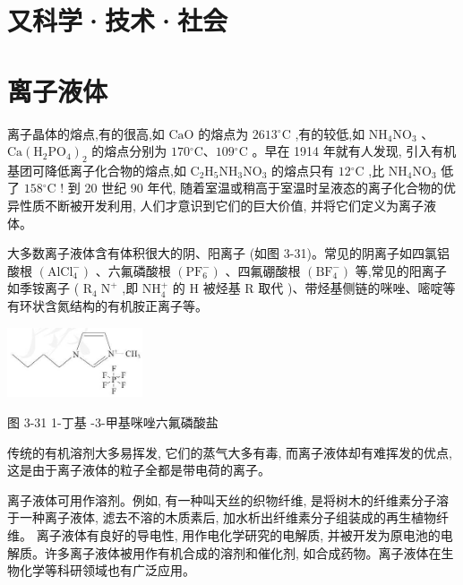 \documentclass[10pt]{article}
\begin{document}
\section*{又科学·技术·社会}

\section*{离子液体}

离子晶体的熔点,有的很高,如 \(\mathrm{{CaO}}\) 的熔点为 \({2613}{}^{ \circ }\mathrm{C}\) ,有的较低,如 \({\mathrm{{NH}}}_{4}{\mathrm{{NO}}}_{3}\) 、 \(\mathrm{{Ca}}{\left( {\mathrm{H}}_{2}{\mathrm{{PO}}}_{4}\right) }_{2}\) 的熔点分别为 \({170}{}^{ \circ }\mathrm{C}\text{、}{109}{}^{ \circ }\mathrm{C}\) 。早在 1914 年就有人发现, 引入有机基团可降低离子化合物的熔点,如 \({\mathrm{C}}_{2}{\mathrm{H}}_{5}{\mathrm{{NH}}}_{3}{\mathrm{{NO}}}_{3}\) 的熔点只有 \({12}{}^{ \circ }\mathrm{C}\) ,比 \({\mathrm{{NH}}}_{4}{\mathrm{{NO}}}_{3}\) 低了 \({158}{}^{ \circ }\mathrm{C}\) ! 到 20 世纪 90 年代, 随着室温或稍高于室温时呈液态的离子化合物的优异性质不断被开发利用, 人们才意识到它们的巨大价值, 并将它们定义为离子液体。

大多数离子液体含有体积很大的阴、阳离子 (如图 3-31)。常见的阴离子如四氯铝酸根 \(\left( {\mathrm{{AlCl}}}_{4}^{ - }\right)\) 、六氟磷酸根 \(\left( {\mathrm{{PF}}}_{6}^{ - }\right)\) 、四氟硼酸根 \(\left( {\mathrm{{BF}}}_{4}^{ - }\right)\) 等,常见的阳离子如季铵离子 ( \({\mathrm{R}}_{4}{\mathrm{\;N}}^{ + }\) ,即 \({\mathrm{{NH}}}_{4}^{ + }\) 的 \(\mathrm{H}\) 被烃基 \(\mathrm{R}\) 取代 )、带烃基侧链的咪唑、嘧啶等有环状含氮结构的有机胺正离子等。

\begin{center}
\includegraphics[max width=0.3\textwidth]{images/0190e026-5a11-7df7-bd27-54d09026ba7a_91_448409.jpg}
\end{center}

图 3-31 1-丁基 -3-甲基咪唑六氟磷酸盐

传统的有机溶剂大多易挥发, 它们的蒸气大多有毒, 而离子液体却有难挥发的优点, 这是由于离子液体的粒子全都是带电荷的离子。

离子液体可用作溶剂。例如, 有一种叫天丝的织物纤维, 是将树木的纤维素分子溶于一种离子液体, 滤去不溶的木质素后, 加水析出纤维素分子组装成的再生植物纤维。 离子液体有良好的导电性, 用作电化学研究的电解质, 并被开发为原电池的电解质。许多离子液体被用作有机合成的溶剂和催化剂, 如合成药物。离子液体在生物化学等科研领域也有广泛应用。
\end{document}
